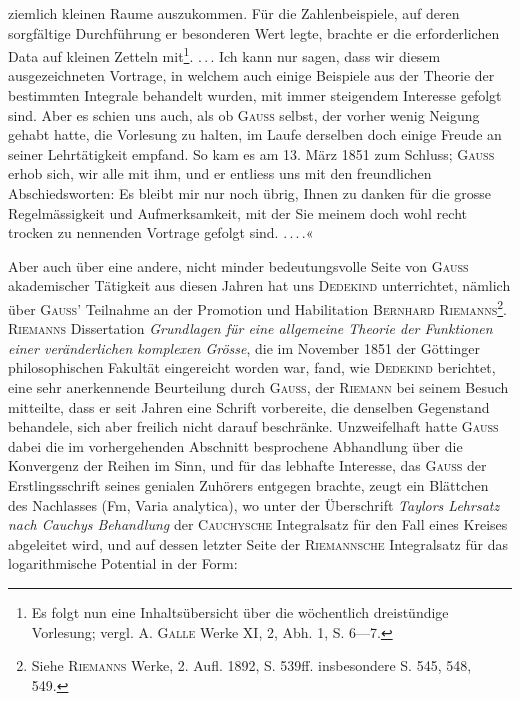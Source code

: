 ziemlich kleinen Raume auszukommen. Für die Zahlenbeispiele, auf deren
sorgfältige Durchführung er besonderen Wert legte, brachte er die erforderlichen
Data auf kleinen Zetteln mit\footnote{Es folgt nun eine Inhaltsübersicht über die wöchentlich dreistündige Vorlesung; vergl. \textsc{A. Galle} Werke XI, 2, Abh. 1, S. 6—7.}. \mbox{.\,.\,.} Ich kann nur sagen, dass wir
diesem ausgezeichneten Vortrage, in welchem auch einige Beispiele aus der
Theorie der bestimmten Integrale behandelt wurden, mit immer steigendem
Interesse gefolgt sind. Aber es schien uns auch, als ob \textsc{Gauss} selbst, der
vorher wenig Neigung gehabt hatte, die Vorlesung zu halten, im Laufe derselben
doch einige Freude an seiner Lehrtätigkeit empfand. So kam es am
13. März 1851 zum Schluss; \textsc{Gauss} erhob sich, wir alle mit ihm, und er entliess
uns mit den freundlichen Abschiedsworten: Es bleibt mir nur noch übrig,
Ihnen zu danken für die grosse Regelmässigkeit und Aufmerksamkeit, mit
der Sie meinem doch wohl recht trocken zu nennenden Vortrage gefolgt sind.
\mbox{.\,.\,.\,.}«\par
\clearpage{}
Aber auch über eine andere, nicht minder bedeutungsvolle Seite von \textsc{Gauss}
akademischer Tätigkeit aus diesen Jahren hat uns \textsc{Dedekind} unterrichtet, nämlich
über \textsc{Gauss'} Teilnahme an der Promotion und Habilitation \textsc{Bernhard
Riemanns}\footnote{Siehe \textsc{Riemanns} Werke, 2. Aufl. 1892, S. 539ff. insbesondere S. 545, 548, 549.}. \textsc{Riemanns} Dissertation \textit{Grundlagen für eine allgemeine Theorie der
Funktionen einer veränderlichen komplexen Grösse}, die im November 1851 der
Göttinger philosophischen Fakultät eingereicht worden war, fand, wie \textsc{Dedekind}
berichtet, eine sehr anerkennende Beurteilung durch \textsc{Gauss}, der \textsc{Riemann}
bei seinem Besuch mitteilte, dass er seit Jahren eine Schrift vorbereite, die
denselben Gegenstand behandele, sich aber freilich nicht darauf beschränke.
Unzweifelhaft hatte \textsc{Gauss} dabei die im vorhergehenden Abschnitt besprochene
Abhandlung über die Konvergenz der Reihen im Sinn, und für das lebhafte
Interesse, das \textsc{Gauss} der Erstlingsschrift seines genialen Zuhörers entgegen
brachte, zeugt ein Blättchen des Nachlasses (Fm, Varia analytica), wo unter
der Überschrift \textit{Taylors Lehrsatz nach Cauchys Behandlung} der \textsc{Cauchysche}
Integralsatz für den Fall eines Kreises abgeleitet wird, und auf dessen letzter
Seite der \textsc{Riemannsche} Integralsatz für das logarithmische Potential in der Form:
